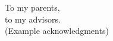 

\thispagestyle{empty}

\vspace*{1.85cm}

\begin{flushright}
To my parents,\\
to my advisors.\\
(Example acknowledgments)
\end{flushright}

\vspace*{\fill}